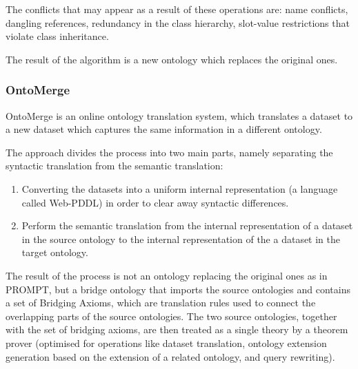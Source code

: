 The conflicts that may appear as a result of these operations are: name
conflicts, dangling references, redundancy in the class hierarchy,
slot-value restrictions that violate class inheritance. 

The result of the algorithm is a new ontology which replaces the
original ones. 

\subsubsection{OntoMerge}
OntoMerge \cite{dou2002ontology_translation} is an online ontology translation system,
which translates a dataset to a new dataset which captures the same
information in a different ontology. 

The approach divides the process into two main parts, namely separating
the syntactic translation from the semantic translation: 

\begin{enumerate}
\item Converting the datasets into a uniform internal representation (a
language called Web-PDDL) in order to clear away syntactic differences.

\item Perform the semantic translation from the internal representation
of a dataset in the source ontology to the internal representation of
the a dataset in the target ontology. 
\end{enumerate}
The result of the process is not an ontology replacing the original ones
as in PROMPT, but a bridge ontology that imports the source ontologies
and contains a set of Bridging Axioms, which are translation rules used
to connect the overlapping parts of the source ontologies. The two
source ontologies, together with the set of bridging axioms, are then
treated as a single theory by a theorem prover (optimised for
operations like dataset translation, ontology extension generation
based on the extension of a related ontology, and query rewriting). 